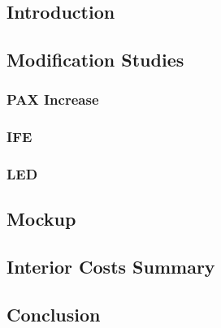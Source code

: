 \subsection{Introduction}
    

\subsection{Modification Studies}
    \subsubsection{PAX Increase}
        
    \subsubsection{IFE}
        
    \subsubsection{LED}
        

\subsection{Mockup}
    

\subsection{Interior Costs Summary}
    

\subsection{Conclusion}
    

